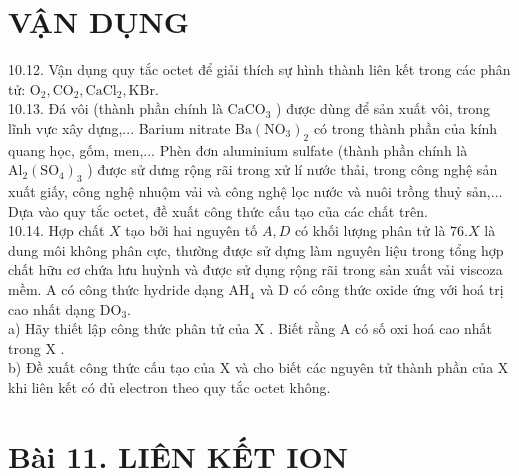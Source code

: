 \documentclass[10pt]{article}
\begin{document}
\section*{VẬN DỤNG}
10.12. Vận dụng quy tắc octet để giải thích sự hình thành liên kết trong các phân tử: $\mathrm{O}_{2}, \mathrm{CO}_{2}, \mathrm{CaCl}_{2}, \mathrm{KBr}$.\\
10.13. Đá vôi (thành phần chính là $\mathrm{CaCO}_{3}$ ) được dùng để sản xuất vôi, trong lĩnh vực xây dựng,... Barium nitrate $\mathrm{Ba}\left(\mathrm{NO}_{3}\right)_{2}$ có trong thành phần của kính quang học, gốm, men,... Phèn đơn aluminium sulfate (thành phần chính là $\mathrm{Al}_{2}\left(\mathrm{SO}_{4}\right)_{3}$ ) được sử dưng rộng rãi trong xử lí nước thải, trong công nghệ sản xuất giấy, công nghệ nhuộm vải và công nghệ lọc nước và nuôi trồng thuỷ sản,... Dựa vào quy tắc octet, đề xuất công thức cấu tạo của các chất trên.\\
10.14. Hợp chất $X$ tạo bởi hai nguyên tố $A, D$ có khối lượng phân tử là $76 . X$ là dung môi không phân cực, thường được sử dựng làm nguyên liệu trong tổng hợp chất hữu cơ chứa lưu huỳnh và được sử dụng rộng rãi trong sản xuất vải viscoza mềm. A có công thức hydride dạng $\mathrm{AH}_{4}$ và D có công thức oxide ứng với hoá trị cao nhất dạng $\mathrm{DO}_{3}$.\\
a) Hãy thiết lập công thức phân tử của X . Biết rằng A có số oxi hoá cao nhất trong X .\\
b) Đề xuất công thức cấu tạo của X và cho biết các nguyên tử thành phần của X khi liên kết có đủ electron theo quy tắc octet không.

\section*{Bài 11. LIÊN KẾT ION}
\end{document}
